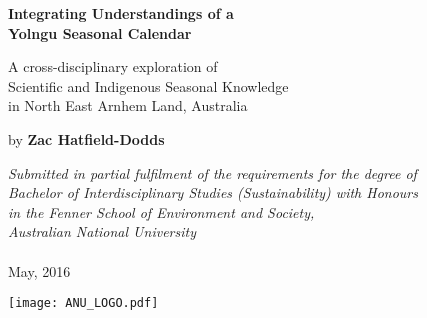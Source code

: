 \renewcommand*{\maketitle}{%
\begin{titlepage}
    \begin{center}
        \vspace*{1cm}

        \Huge
        \textbf{Integrating Understandings of a\\
        Yolngu Seasonal Calendar}

        \vspace{1cm}
        \Large
        A cross-disciplinary exploration of\\
        Scientific and Indigenous Seasonal Knowledge\\
        in North East Arnhem Land, Australia

        \vspace{1.5cm}

        by \textbf{Zac Hatfield-Dodds}

        \vfill

        \large \textit{
        Submitted in partial fulfilment of the requirements for the degree of\\
        Bachelor of Interdisciplinary Studies (Sustainability) with Honours\\
        in the Fenner School of Environment and Society,\\
        Australian National University\\
        }~\\
        May, 2016

        \vspace{1.5cm}

        \texttt{[image: ANU\_LOGO.pdf]}

    \end{center}
\end{titlepage}
}

\maketitle
